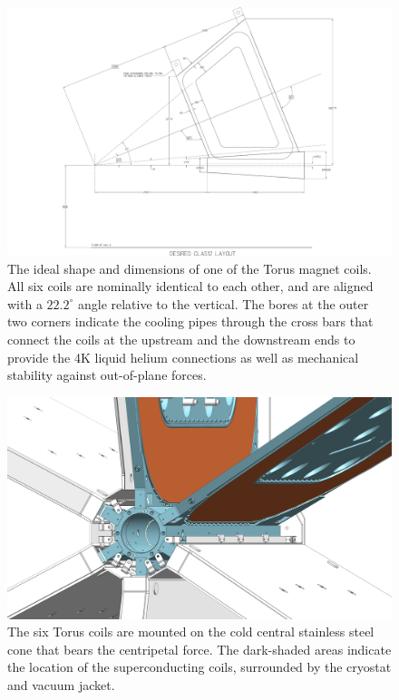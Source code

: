 \documentclass[final,3p,times,twocolumn,authoryear]{elsarticle}
\begin{document}
\begin{figure}[htbp!]
\centerline{\includegraphics[width=1.40\columnwidth]{clas12_desired.pdf}}
\caption{\footnotesize The ideal shape and dimensions of one of the Torus magnet coils. All six coils are nominally identical to each other, and are aligned with a $22.2^\circ$ angle relative to the vertical. The bores at the outer two corners indicate the cooling pipes through the
cross bars that connect the coils at the upstream and the downstream ends to provide the 4K liquid helium connections as well as mechanical stability against out-of-plane forces. }
\label{coil-shape}
\end{figure}
\begin{figure}[htbp!]
\centerline{\includegraphics[width=1.00\columnwidth]{torus-hub-2.png}}
\caption{\footnotesize The six Torus coils are mounted on the cold central stainless steel cone that bears the centripetal force. The dark-shaded areas indicate the location of the superconducting coils, surrounded by the cryostat and vacuum jacket.}
\label{coil-mount}
\end{figure}
\end{document}
